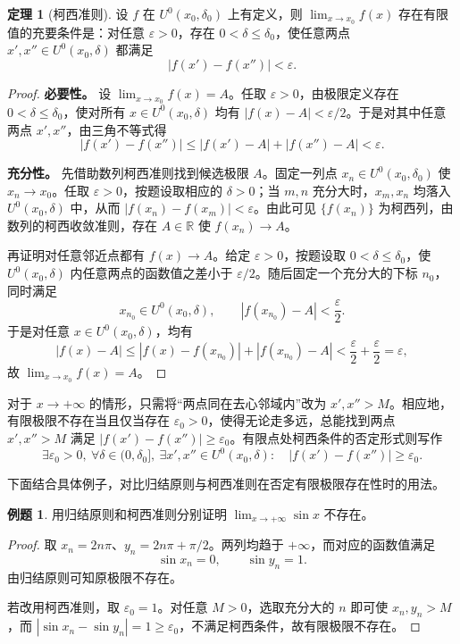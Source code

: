 \documentclass[UTF8,fontset=fandol,a4paper,12pt]{ctexart}
\newcommand{\R}{\mathbb R}
\newcommand{\U}{U}
\theoremstyle{definition}
\newtheorem{theorem}{定理}
\newtheorem*{example}{例题}
\begin{document}
\begin{theorem}[柯西准则]
设 $f$ 在 $\U^0(x_0,\delta_0)$ 上有定义，则 $\lim_{x\to x_0}f(x)$ 存在有限值的充要条件是：对任意 $\varepsilon>0$，存在 $0<\delta\le\delta_0$，使任意两点 $x',x''\in\U^0(x_0,\delta)$ 都满足
\[
 |f(x')-f(x'')|<\varepsilon.
\]
\end{theorem}
\begin{proof}
\textbf{必要性。} 设 $\lim_{x\to x_0}f(x)=A$。任取 $\varepsilon>0$，由极限定义存在 $0<\delta\le\delta_0$，使对所有 $x\in\U^0(x_0,\delta)$ 均有 $|f(x)-A|<\varepsilon/2$。于是对其中任意两点 $x',x''$，由三角不等式得
\[
 |f(x')-f(x'')|
 \le |f(x')-A|+|f(x'')-A|<\varepsilon.
\]

\textbf{充分性。} 先借助数列柯西准则找到候选极限 $A$。固定一列点 $x_n\in\U^0(x_0,\delta_0)$ 使 $x_n\to x_0$。任取 $\varepsilon>0$，按题设取相应的 $\delta>0$；当 $m,n$ 充分大时，$x_m,x_n$ 均落入 $\U^0(x_0,\delta)$ 中，从而 $|f(x_n)-f(x_m)|<\varepsilon$。由此可见 $\{f(x_n)\}$ 为柯西列，由数列的柯西收敛准则，存在 $A\in\R$ 使 $f(x_n)\to A$。

再证明对任意邻近点都有 $f(x)\to A$。给定 $\varepsilon>0$，按题设取 $0<\delta\le\delta_0$，使 $\U^0(x_0,\delta)$ 内任意两点的函数值之差小于 $\varepsilon/2$。随后固定一个充分大的下标 $n_0$，同时满足
\[
 x_{n_0}\in\U^0(x_0,\delta),\qquad
 |f(x_{n_0})-A|<\frac\varepsilon2.
\]
于是对任意 $x\in\U^0(x_0,\delta)$，均有
\[
 |f(x)-A|\le |f(x)-f(x_{n_0})|+|f(x_{n_0})-A|
 <\frac\varepsilon2+\frac\varepsilon2=\varepsilon,
\]
故 $\lim_{x\to x_0}f(x)=A$。
\end{proof}

对于 $x\to+\infty$ 的情形，只需将“两点同在去心邻域内”改为 $x',x''>M$。相应地，有限极限不存在当且仅当存在 $\varepsilon_0>0$，使得无论走多远，总能找到两点 $x',x''>M$ 满足 $|f(x')-f(x'')|\ge\varepsilon_0$。有限点处柯西条件的否定形式则写作
\[
 \exists\varepsilon_0>0,\ \forall\delta\in(0,\delta_0],\
 \exists x',x''\in\U^0(x_0,\delta):\quad
 |f(x')-f(x'')|\ge\varepsilon_0.
\]

下面结合具体例子，对比归结原则与柯西准则在否定有限极限存在性时的用法。

\begin{example}
用归结原则和柯西准则分别证明 $\displaystyle\lim_{x\to+\infty}\sin x$ 不存在。
\end{example}
\begin{proof}
取 $x_n=2n\pi$、$y_n=2n\pi+\pi/2$。两列均趋于 $+\infty$，而对应的函数值满足
\[
 \sin x_n=0,\qquad \sin y_n=1.
\]
由归结原则可知原极限不存在。

若改用柯西准则，取 $\varepsilon_0=1$。对任意 $M>0$，选取充分大的 $n$ 即可使 $x_n,y_n>M$，而 $|\sin x_n-\sin y_n|=1\ge\varepsilon_0$，不满足柯西条件，故有限极限不存在。
\end{proof}
\end{document}
